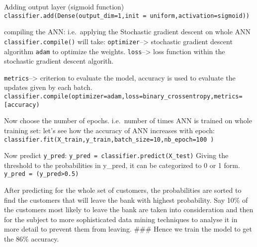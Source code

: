 \documentclass[11pt]{article}
\begin{document}
 Adding output layer (sigmoid function)
\texttt{classifier.add(Dense(output\_dim=1,init\ =\ \textquotesingle{}uniform\textquotesingle{},activation=\textquotesingle{}sigmoid\textquotesingle{}))}

 compiling the ANN: i.e.~applying the Stochastic gradient descent on
whole ANN \texttt{classifier.compile()} will take:
\texttt{optimizer}--\textgreater{} stochastic gradient descent algorithm
\texttt{adam} to optimize the weights. \texttt{loss}--\textgreater{}
loss function within the stochastic gradient descent algorith.

 \texttt{metrics}--\textgreater{} criterion to evaluate the model,
accuracy is used to evaluate the updates given by each batch.
\texttt{classifier.compile(optimizer=\textquotesingle{}adam\textquotesingle{},loss=\textquotesingle{}binary\_crossentropy\textquotesingle{},metrics={[}\textquotesingle{}accuracy\textquotesingle{}{]})}

Now choose the number of epochs. i.e.~number of times ANN is trained on
whole training set: let's see how the accuracy of ANN increases with
epoch:
\texttt{classifier.fit(X\_train,y\_train,batch\_size=10,nb\_epoch=100\ )}

Now predict \texttt{y\_pred}:
\texttt{y\_pred\ =\ classifier.predict(X\_test)} Giving the threshold to
the probabilities in y\_pred, it can be categorized to 0 or 1 form.
\texttt{y\_pred\ =\ (y\_pred\textgreater{}0.5)}

 After predicting for the whole set of customers, the probabilities are
sorted to find the customers that will leave the bank with highest
probability. Say 10\% of the customers most likely to leave the bank are
taken into consideration and then for the subject to more sophisticated
data mining techniques to analyse it in more detail to prevent them from
leaving. \#\#\# Hence we train the model to get the 86\% accuracy.
\end{document}
